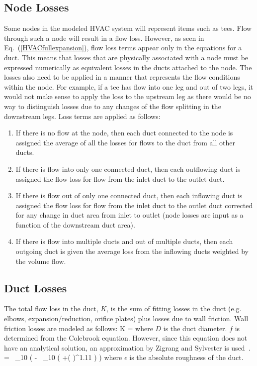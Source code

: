 \subsection{Node Losses}

Some nodes in the modeled HVAC system will represent items such as tees.  Flow through such a node will result in a flow loss.  However, as seen in Eq.~(\ref{HVACfullexpansion}), flow loss terms appear only in the equations for a duct.  This means that losses that are physically associated with a node must be expressed numerically as equivalent losses in the ducts attached to the node.  The losses also need to be applied in a manner that represents the flow conditions within the node.  For example, if a tee has flow into one leg and out of two legs, it would not make sense to apply the loss to the upstream leg as there would be no way to distinguish losses due to any changes of the flow splitting in the downstream legs.  Loss terms are applied as follows:

\begin{enumerate}
\item If there is no flow at the node, then each duct connected to the node is assigned the average of all the losses for flows to the duct from all other ducts.
\item If there is flow into only one connected duct, then each outflowing duct is assigned the flow loss for flow from the inlet duct to the outlet duct.
\item If there is flow out of only one connected duct, then each inflowing duct is assigned the flow loss for flow from the inlet duct to the outlet duct corrected for any change in duct area from inlet to outlet (node losses are input as a function of the downstream duct area).
\item If there is flow into multiple ducts and out of multiple ducts, then each outgoing duct is given the average loss from the inflowing ducts weighted by the volume flow.
\end{enumerate}

\subsection{Duct Losses}

The total flow loss in the duct, $K$, is the sum of fitting losses in the duct (e.g. elbows, expansion/reduction, orifice plates) plus losses due to wall friction.  Wall friction losses are modeled as follows:
\be K \; = \;  \ee
where $D$ is the duct diameter.  $f$ is determined from the Colebrook equation. However, since this equation does not have an analytical solution, an approximation by Zigrang and Sylvester is used~\cite{Zigrang:1}.
\be {} \; =  \, \log_{10} \left(\; - \;  \, \log_{10} \left(
+\left(  \right)^{1.11} \right) \right) \ee
where $\epsilon$ is the absolute roughness of the duct.

